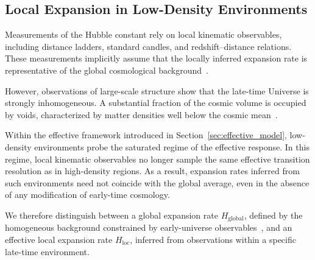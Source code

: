 \subsection{Local Expansion in Low-Density Environments}
  \label{subsec:local_expansion}

  Measurements of the Hubble constant rely on local kinematic observables,
  including distance ladders, standard candles, and redshift--distance relations.
  These measurements implicitly assume that the locally inferred expansion rate
  is representative of the global cosmological background~\cite{Riess2022SH0ES,Freedman2021TRGB}.

  However, observations of large-scale structure show that the late-time Universe
  is strongly inhomogeneous.
  A substantial fraction of the cosmic volume is occupied by voids,
  characterized by matter densities well below the cosmic mean~\cite{Keenan2013KBC}.

  Within the effective framework introduced in
  Section~\ref{sec:effective_model},
  low-density environments probe the saturated regime of the effective response.
  In this regime, local kinematic observables no longer sample the same effective
  transition resolution as in high-density regions.
  As a result, expansion rates inferred from such environments need not coincide
  with the global average, even in the absence of any modification of early-time
  cosmology.

  We therefore distinguish between a global expansion rate
  $H_{\mathrm{global}}$,
  defined by the homogeneous background constrained by early-universe
  observables~\cite{Planck2020},
  and an effective local expansion rate $H_{\mathrm{loc}}$,
  inferred from observations within a specific late-time environment.
